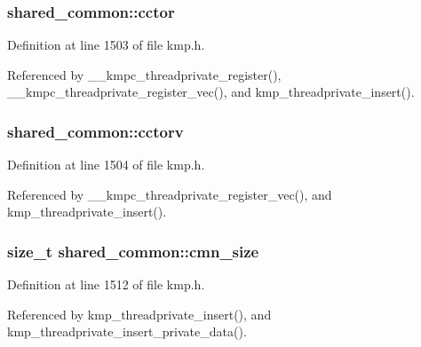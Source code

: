 \hypertarget{structshared__common_a66f5f4ebb70f7db1a21310d31a387377}{
\subsubsection[{cctor}]{ shared\-\_\-common\-::cctor}}\label{structshared__common_a66f5f4ebb70f7db1a21310d31a387377}


Definition at line 1503 of file kmp.\-h.



Referenced by \-\_\-\-\_\-kmpc\-\_\-threadprivate\-\_\-register(), \-\_\-\-\_\-kmpc\-\_\-threadprivate\-\_\-register\-\_\-vec(), and kmp\-\_\-threadprivate\-\_\-insert().

\hypertarget{structshared__common_a149cfcc7e7cadd6231c21339d9adabea}{
\subsubsection[{cctorv}]{ shared\-\_\-common\-::cctorv}}\label{structshared__common_a149cfcc7e7cadd6231c21339d9adabea}


Definition at line 1504 of file kmp.\-h.



Referenced by \-\_\-\-\_\-kmpc\-\_\-threadprivate\-\_\-register\-\_\-vec(), and kmp\-\_\-threadprivate\-\_\-insert().

\hypertarget{structshared__common_acd7343a82a2dd92f8b7a78eab8429b72}{
\subsubsection[{cmn\-\_\-size}]{\setlength{\rightskip}{0pt plus 5cm}size\-\_\-t shared\-\_\-common\-::cmn\-\_\-size}}\label{structshared__common_acd7343a82a2dd92f8b7a78eab8429b72}


Definition at line 1512 of file kmp.\-h.



Referenced by kmp\-\_\-threadprivate\-\_\-insert(), and kmp\-\_\-threadprivate\-\_\-insert\-\_\-private\-\_\-data().

